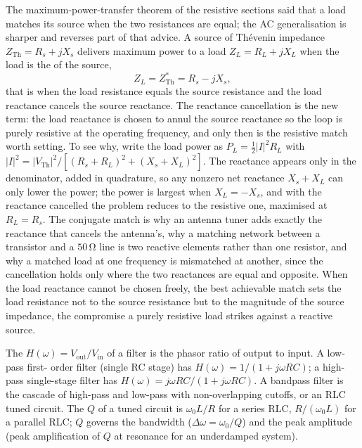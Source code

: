 \begin{mastery}
The maximum-power-transfer theorem of the resistive sections said that a load
matches its source when the two resistances are equal; the AC generalisation is
sharper and reverses part of that advice. A source of Th\'evenin impedance
$Z_{\text{Th}} = R_s + jX_s$ delivers maximum power to a load $Z_L = R_L + jX_L$
when the load is the  of the source,
\[
Z_L = Z_{\text{Th}}^{*} = R_s - jX_s,
\]
that is when the load resistance equals the source resistance and the load
reactance cancels the source reactance. The reactance cancellation is the new
term: the load reactance is chosen to annul the source reactance so the loop is
purely resistive at the operating frequency, and only then is the resistive
match worth setting. To see why, write the load power as $P_L = \tfrac{1}{2}
|I|^{2}R_L$ with $|I|^{2} = |V_{\text{Th}}|^{2}/[(R_s + R_L)^{2} + (X_s +
X_L)^{2}]$. The reactance appears only in the denominator, added in quadrature,
so any nonzero net reactance $X_s + X_L$ can only lower the power; the power is
largest when $X_L = -X_s$, and with the reactance cancelled the problem reduces
to the resistive one, maximised at $R_L = R_s$. The conjugate match is why an
antenna tuner adds exactly the reactance that cancels the antenna's, why a
matching network between a transistor and a $50\,\si{\ohm}$ line is two reactive
elements rather than one resistor, and why a matched load at one frequency is
mismatched at another, since the cancellation holds only where the two
reactances are equal and opposite. When the load reactance cannot be chosen
freely, the best achievable match sets the load resistance not to the source
resistance but to the magnitude of the source impedance, the compromise a
purely resistive load strikes against a reactive source.
\end{mastery}

The  $H(\omega) = V_{\text{out}}/V_{\text{in}}$
of a filter is the phasor ratio of output to input. A low-pass first-
order filter (single RC stage) has $H(\omega) = 1/(1+j\omega RC)$; a
high-pass single-stage filter has $H(\omega) = j\omega RC/(1+j\omega
RC)$. A bandpass filter is the cascade of high-pass and low-pass with
non-overlapping cutoffs, or an RLC tuned circuit. The
 $Q$ of a tuned circuit is $\omega_{0}L/R$
for a series RLC, $R/(\omega_{0}L)$ for a parallel RLC; $Q$ governs
the bandwidth ($\Delta\omega = \omega_{0}/Q$) and the peak amplitude
(peak amplification of $Q$ at resonance for an underdamped system).

